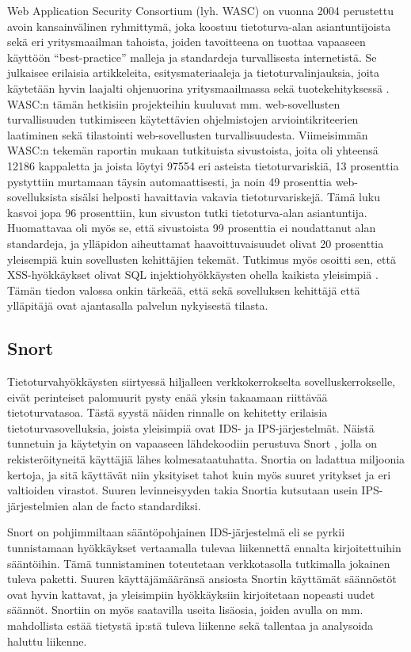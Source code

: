 Web Application Security Consortium (lyh. WASC) on vuonna 2004 perustettu avoin kansainvälinen ryhmittymä, joka koostuu tietoturva-alan asiantuntijoista sekä eri 
yritysmaailman tahoista, joiden tavoitteena on tuottaa vapaaseen käyttöön ``best-practice'' malleja ja standardeja turvallisesta internetistä. Se julkaisee
erilaisia artikkeleita, esitysmateriaaleja ja tietoturvalinjauksia, joita käytetään hyvin laajalti ohjenuorina yritysmaailmassa sekä tuotekehityksessä \cite{WASC}.
WASC:n tämän hetkisiin projekteihin kuuluvat mm. web-sovellusten turvallisuuden tutkimiseen käytettävien ohjelmistojen arviointikriteerien laatiminen sekä tilastointi
web-sovellusten turvallisuudesta. Viimeisimmän WASC:n tekemän raportin mukaan tutkituista sivustoista, joita oli yhteensä 12186 kappaletta ja joista löytyi 97554 
eri asteista tietoturvariskiä, 13 prosenttia pystyttiin murtamaan täysin automaattisesti, ja noin 49 prosenttia web-sovelluksista sisälsi helposti havaittavia vakavia 
tietoturvariskejä. Tämä luku kasvoi jopa 96 prosenttiin, kun sivuston tutki tietoturva-alan asiantuntija. Huomattavaa oli myös se, että sivustoista 99 prosenttia
ei noudattanut alan standardeja, ja ylläpidon aiheuttamat haavoittuvaisuudet olivat 20 prosenttia yleisempiä kuin sovellusten kehittäjien tekemät. Tutkimus myös 
osoitti sen, että XSS-hyökkäykset olivat SQL injektiohyökkäysten ohella kaikista yleisimpiä \cite{WASCb}. Tämän tiedon valossa onkin tärkeää, että sekä sovelluksen
kehittäjä että ylläpitäjä ovat ajantasalla palvelun nykyisestä tilasta. 

\subsection{Snort}

Tietoturvahyökkäysten siirtyessä hiljalleen verkkokerrokselta sovelluskerrokselle, eivät perinteiset palomuurit pysty enää yksin takaamaan riittävää tietoturvatasoa. Tästä syystä näiden
rinnalle on kehitetty erilaisia tietoturvasovelluksia, joista yleisimpiä ovat IDS- ja IPS-järjestelmät. Näistä tunnetuin ja käytetyin on vapaaseen lähdekoodiin perustuva Snort \cite{Snort}, jolla 
on rekisteröityneitä käyttäjiä lähes kolmesataatuhatta. Snortia on ladattua miljoonia kertoja, ja sitä käyttävät niin yksityiset tahot kuin myös suuret yritykset ja eri valtioiden virastot. Suuren
levinneisyyden takia Snortia kutsutaan usein IPS-järjestelmien alan de facto standardiksi.

Snort on pohjimmiltaan sääntöpohjainen IDS-järjestelmä eli se pyrkii tunnistamaan hyökkäykset vertaamalla tulevaa liikennettä ennalta kirjoitettuihin sääntöihin. Tämä tunnistaminen toteutetaan
verkkotasolla tutkimalla jokainen tuleva paketti. Suuren käyttäjämääränsä ansiosta Snortin käyttämät säännöstöt ovat hyvin kattavat, ja yleisimpiin hyökkäyksiin kirjoitetaan
nopeasti uudet säännöt. Snortiin on myös saatavilla useita lisäosia, joiden avulla on mm. mahdollista estää tietystä ip:stä tuleva liikenne sekä tallentaa ja analysoida haluttu liikenne. 

